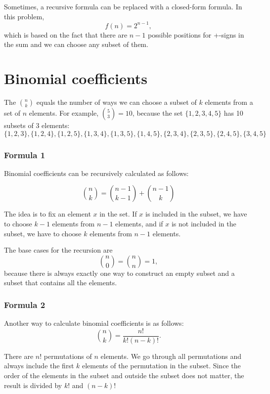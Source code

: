 Sometimes, a recursive formula can be replaced
with a closed-form formula.
In this problem,
\[
    f(n)=2^{n-1},
\]
which is based on the fact that there are $n-1$
possible positions for +-signs in the sum
and we can choose any subset of them.

\section{Binomial coefficients}


The  $\binom{n}{k}$
equals the number of ways we can choose a subset
of $k$ elements from a set of $n$ elements.
For example, $\binom{5}{3}=10$,
because the set $\{1,2,3,4,5\}$
has 10 subsets of 3 elements:
\[ \{1,2,3\}, \{1,2,4\}, \{1,2,5\}, \{1,3,4\}, \{1,3,5\},
    \{1,4,5\}, \{2,3,4\}, \{2,3,5\}, \{2,4,5\}, \{3,4,5\} \]

\subsubsection{Formula 1}

Binomial coefficients can be
recursively calculated as follows:

\[
    \binom{n}{k} = \binom{n-1}{k-1} + \binom{n-1}{k}
\]

The idea is to fix an element $x$ in the set.
If $x$ is included in the subset,
we have to choose $k-1$
elements from $n-1$ elements,
and if $x$ is not included in the subset,
we have to choose $k$ elements from $n-1$ elements.

The base cases for the recursion are
\[
    \binom{n}{0}  =  \binom{n}{n} = 1,
\]
because there is always exactly
one way to construct an empty subset
and a subset that contains all the elements.

\subsubsection{Formula 2}

Another way to calculate binomial coefficients is as follows:
\[
    \binom{n}{k}  =  \frac{n!}{k!(n-k)!}.
\]

There are $n!$ permutations of $n$ elements.
We go through all permutations and always
include the first $k$ elements of the permutation
in the subset.
Since the order of the elements in the subset
and outside the subset does not matter,
the result is divided by $k!$ and $(n-k)!$

